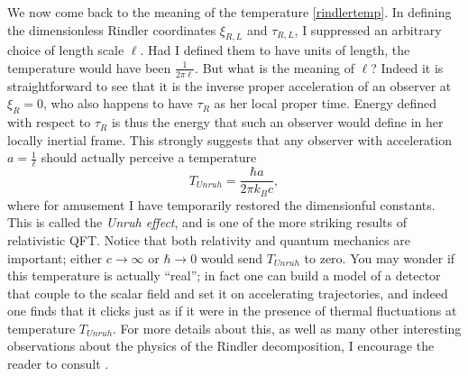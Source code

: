 \documentclass[12pt]{article}
\newcommand{\be}{\begin{equation}}
\newcommand{\ee}{\end{equation}}
\begin{document}
We now come back to the meaning of the temperature \eqref{rindlertemp}.  In defining the dimensionless Rindler coordinates $\xi_{R,L}$ and $\tau_{R,L}$, I suppressed an arbitrary choice of length scale $\ell$.  Had I defined them to have units of length, the temperature would have been $\frac{1}{2\pi \ell}$.  But what is the meaning of $\ell$?  Indeed it is straightforward to see that it is the inverse proper acceleration of an observer at $\xi_R=0$, who also happens to have $\tau_R$ as her local proper time.  Energy defined with respect to $\tau_R$ is thus the energy that such an observer would define in her locally inertial frame.  This strongly suggests that any observer with acceleration $a=\frac{1}{\ell}$  should actually perceive a temperature
\be\label{unruh}
T_{Unruh}=\frac{\hbar a}{2\pi k_B c},
\ee
where for amusement I have temporarily restored the dimensionful constants.  This is called the \textit{Unruh effect}, and is one of the more striking results of relativistic QFT.  Notice that both relativity and quantum mechanics are important; either $c\to\infty$ or $\hbar\to0$ would send $T_{Unruh}$ to zero.  You may wonder if this temperature is actually ``real''; in fact one can build a model of a detector that couple to the scalar field and set it on accelerating trajectories, and indeed one finds that it clicks just as if it were in the presence of thermal fluctuations at temperature $T_{Unruh}$.  For more details about this, as well as many other interesting observations about the physics of the Rindler decomposition, I encourage the reader to consult \cite{Unruh:1983ms}.
\end{document}
